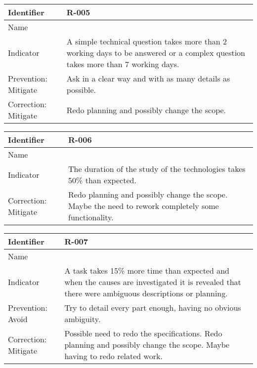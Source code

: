 \begin{table}[H]
	\begin{tabularx}{\textwidth}{|y|z|}
		\hline
		Identifier & \textbf{R-005} \\ \hline
		Name & \Rcinco \\ \hline
		Indicator & A simple technical question takes more than 2 working days to be answered or a complex question takes more than 7 working days.\\ \hline
		Prevention: Mitigate
			& Ask in a clear way and with as many details as possible.\\ \hline
		Correction: Mitigate
			& Redo planning and possibly change the scope.  \\ \hline
	\end{tabularx}
\end{table}

\begin{table}[H]
	\begin{tabularx}{\textwidth}{|y|z|}
		\hline
		Identifier & \textbf{R-006} \\ \hline
		Name & \Rseis \\ \hline
		Indicator & The duration of the study of the technologies takes 50\% than expected. \\ \hline
		Correction: Mitigate
			& Redo planning and possibly change the scope.  \linej
			 Maybe the need to rework completely some functionality. \\ \hline
	\end{tabularx}
\end{table}

\begin{table}[H]
	\begin{tabularx}{\textwidth}{|y|z|}
		\hline
		Identifier & \textbf{R-007} \\ \hline
		Name & \Rsiete \\ \hline
		Indicator & A task takes 15\% more time than expected and when the causes are investigated it is revealed that there were ambiguous descriptions or planning.\\ \hline
		Prevention: Avoid & Try to detail every part enough, having no obvious ambiguity.\\ \hline
		Correction: Mitigate
			& Possible need to redo the specifications.  \linej
			 Redo planning and possibly change the scope.  \linej
			 Maybe having to redo related work.  \\ \hline
	\end{tabularx}
\end{table}

